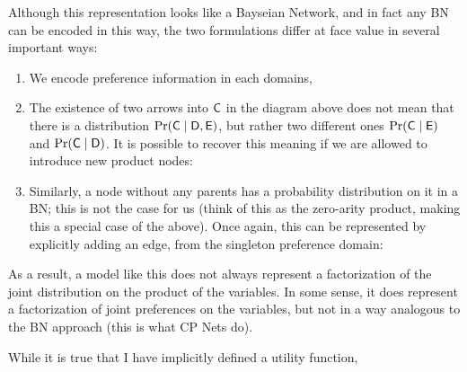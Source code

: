 \documentclass{article}
\begin{document}
	Although this representation looks like a Bayseian Network, and in fact any BN can be encoded in this way, the two formulations differ at face value in several important ways:
	\begin{enumerate}
		\item We encode preference information in each domains, 
		
		
		\item The existence of two arrows into $\sf C$ in the diagram above does not mean that there is a distribution $\Pr({\sf C \mid D, E})$, but rather two different ones $\Pr\sf( C \mid E)$ and $\Pr\sf(C \mid D)$. It is possible to recover this meaning if we are allowed to introduce new product nodes:
		\begin{center}
		\end{center}
		
		\item Similarly, a node without any parents has a probability distribution on it in a BN; this is not the case for us (think of this as the zero-arity product, making this a special case of the above). Once again, this can be represented by explicitly adding an edge, from the singleton preference domain:
		\begin{center}
		\end{center}
		
	\end{enumerate}
	As a result, a model like this does not always represent a factorization of the joint distribution on the product of the variables. In some sense, it does represent a factorization of joint preferences on the variables, but not in a way analogous to the BN approach (this is what CP Nets do).
	
	While it is true that I have implicitly defined a utility function, 
	
\end{document}
